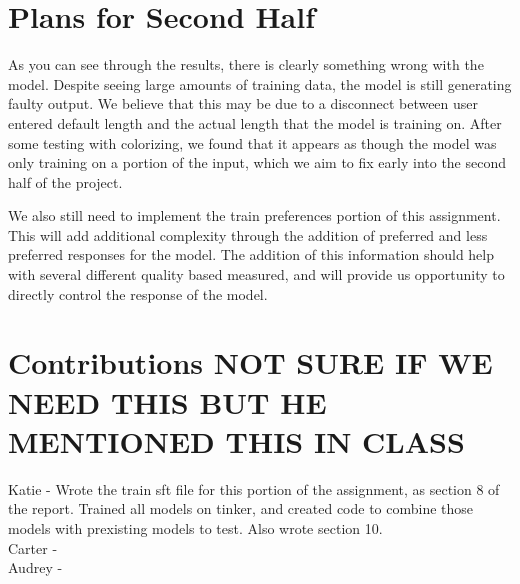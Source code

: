 \documentclass[11pt]{article}
\begin{document}
\section{Plans for Second Half}
As you can see through the results, there is clearly something wrong with the model. Despite seeing large amounts of training data, the model is still generating faulty output. We believe that this may be due to a disconnect between user entered default length and the actual length that the model is training on. After some testing with colorizing, we found that it appears as though the model was only training on a portion of the input, which we aim to fix early into the second half of the project.

We also still need to implement the train preferences portion of this assignment. This will add additional complexity through the addition of preferred and less preferred responses for the model. The addition of this information should help with several different quality based measured, and will provide us opportunity to directly control the response of the model. 

\section{Contributions NOT SURE IF WE NEED THIS BUT HE MENTIONED THIS IN CLASS}
Katie - Wrote the train sft file for this portion of the assignment, as section 8 of the report. Trained all models on tinker, and created code to combine those models with prexisting models to test. Also wrote section 10.
\\
Carter - 
\\
Audrey - 



\end{document}
